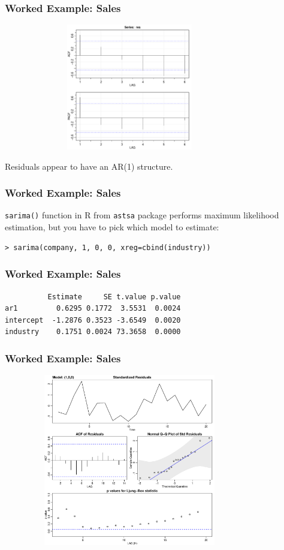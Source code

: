 \documentclass[%
xcolor=pdftex]{beamer}
\begin{document}
\begin{frame}
\frametitle{Worked Example: Sales}

\includegraphics[width=110mm, height=55mm]{acfs.pdf}

Residuals appear to have an AR(1) structure.

\end{frame}

\begin{frame}[fragile]
\frametitle{Worked Example: Sales}

\verb=sarima()= function in R from \verb=astsa= package performs maximum likelihood estimation, but you have to pick which model to estimate:

\begin{verbatim}
> sarima(company, 1, 0, 0, xreg=cbind(industry))
\end{verbatim}


\end{frame}



\begin{frame}[fragile]
\frametitle{Worked Example: Sales}


\begin{verbatim}
          Estimate     SE t.value p.value
ar1         0.6295 0.1772  3.5531  0.0024
intercept  -1.2876 0.3523 -3.6549  0.0020
industry    0.1751 0.0024 73.3658  0.0000
\end{verbatim}


\end{frame}

\begin{frame}
\frametitle{Worked Example: Sales}


\includegraphics[width=110mm, height=75mm]{diag1.pdf}



\end{frame}
\end{document}
